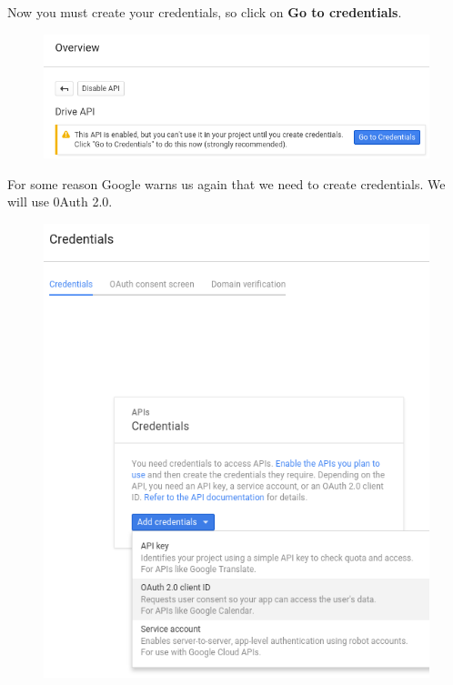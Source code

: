 \documentclass[letterpaper,10pt,english]{sphinxmanual}
\begin{document}
Now you must create your credentials, so click on \textbf{Go to credentials}.
\begin{figure}[htbp]
\centering

\includegraphics{google-drive5.png}
\end{figure}

For some reason Google warns us again that we need to create credentials. We
will use 0Auth 2.0.
\begin{figure}[htbp]
\centering

\includegraphics{google-drive6.png}
\end{figure}
\end{document}
